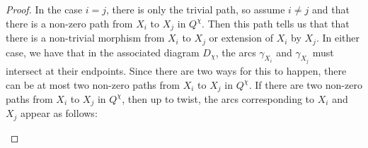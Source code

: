 \documentclass[12pt]{amsart}
\theoremstyle{plain}
\theoremstyle{definition}
\theoremstyle{remark}
\begin{document}
\begin{proof}
In the case $i=j$, there is only the trivial path, so assume $i \neq j$ and that there is a non-zero path from $X_i$ to $X_j$ in $Q^{\chi}$. Then this path tells us that that there is a non-trivial morphism from $X_i$ to $X_j$ or extension of $X_i$ by $X_j$. In either case, we have that in the associated diagram $D_{\chi}$, the arcs $\gamma_{X_i}$ and $\gamma_{X_j}$ must intersect at their endpoints. Since there are two ways for this to happen, there can be at most two non-zero paths from $X_i$ to $X_j$ in $Q^{\chi}$. {\color{black} If there are two non-zero paths from $X_i$ to $X_j$ in $Q^{\chi}$, then up to twist, the arcs corresponding to $X_i$ and $X_j$ appear as follows:}

\begin{center}



\begin{tikzpicture}[x=0.75pt,y=0.75pt,yscale=-1,xscale=1]


\end{tikzpicture}
\end{center}
\end{proof}
\end{document}
